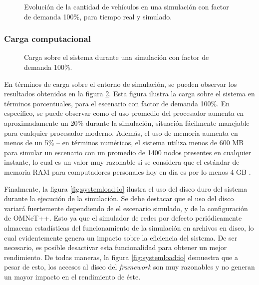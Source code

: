 \begin{figure}[tpb]
    \centering
    
    \caption[Evolución temporal de la cantidad de vehículos en la simulación.]{Evolución de la cantidad de vehículos en una simulación con factor de demanda 100\%, para tiempo real y simulado.}
    \label{fig:timevsvehicles_evolution}
\end{figure}

\subsubsection{Carga computacional}

\begin{figure}[tpb]
    \centering
    
    \caption[Carga sobre el sistema durante una simulación]{Carga sobre el sistema durante una simulación con factor de demanda 100\%.}
    \label{fig:systemload:cpuram}
\end{figure}

En términos de carga sobre el entorno de simulación, se pueden observar los resultados obtenidos en la figura \ref{fig:systemload:cpuram}. Esta figura ilustra la carga sobre el sistema en términos porcentuales, para el escenario con factor de demanda 100\%. En específico, se puede observar como el uso promedio del procesador aumenta en aproximadamente un 20\% durante la simulación, situación fácilmente manejable para cualquier procesador moderno. Además, el uso de memoria aumenta en menos de un 5\% -- en términos numéricos, el sistema utiliza menos de 600 MB para simular un escenario con un promedio de 1400 nodos presentes en cualquier instante, lo cual es un valor muy razonable si se considera que el estándar de memoria RAM para computadores personales hoy en día es por lo menos 4 GB \autocite{steamhwsurvey, unityhardwaresurvey}.

Finalmente, la figura \ref{fig:systemload:io} ilustra el uso del disco duro del sistema durante la ejecución de la simulación. Se debe destacar que el uso del disco variará fuertemente dependiendo de el escenario simulado, y de la configuración de OMNeT++. Esto ya que el simulador de redes por defecto periódicamente almacena estadísticas del funcionamiento de la simulación en archivos en disco, lo cual evidentemente genera un impacto sobre la eficiencia del sistema. De ser necesario, es posible desactivar esta funcionalidad para obtener un mejor rendimiento. De todas maneras, la figura \ref{fig:systemload:io} demuestra que a pesar de esto, los accesos al disco del \emph{framework} son muy razonables y no generan un mayor impacto en el rendimiento de éste.

